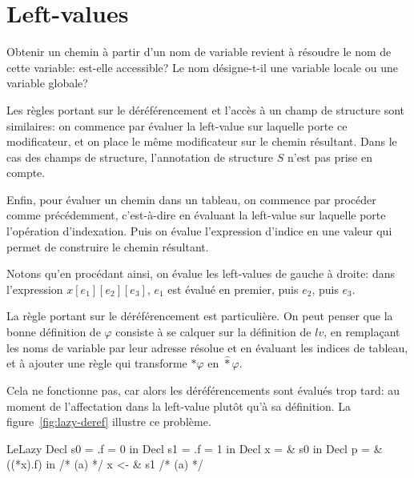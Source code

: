 \section{Left-values}
\label{sec:eval-lv}


Obtenir un chemin à partir d'un nom de variable revient à résoudre le nom de
cette variable: est-elle accessible? Le nom désigne-t-il une variable locale
ou une variable globale?

\begin{mathpar}
\end{mathpar}

Les règles portant sur le déréférencement et l'accès à un champ de structure
sont similaires: on commence par évaluer la left-value sur laquelle porte ce
modificateur, et on place le même modificateur sur le chemin résultant. Dans le
cas des champs de structure, l'annotation de structure $S$ n'est pas prise
en compte.

\begin{mathpar}
\end{mathpar}

Enfin, pour évaluer un chemin dans un tableau, on commence par procéder comme
précédemment, c'est-à-dire en évaluant la left-value sur laquelle porte
l'opération d'indexation. Puis on évalue l'expression d'indice en une valeur qui
permet de construire le chemin résultant.

\begin{mathpar}
\end{mathpar}

Notons qu'en procédant ainsi, on évalue les left-values de gauche à droite:
dans l'expression $x[e_1][e_2][e_3]$, $e_1$ est évalué en premier, puis
$e_2$, puis $e_3$.

La règle portant sur le déréférencement est particulière. On peut penser que la
bonne définition de $φ$ consiste à se calquer sur la définition de $lv$, en
remplaçant les noms de variable par leur adresse résolue et en évaluant les
indices de tableau, et à ajouter une règle qui transforme $*φ$ en
$\widehat{*}φ$.

Cela ne fonctionne pas, car alors les déréférencements sont évalués trop tard:
au moment de l'affectation dans la left-value plutôt qu'à sa définition. La
figure~\ref{fig:lazy-deref} illustre ce problème.

\begin{SaveVerbatim}[]{LeLazy}
Decl s0 = { .f = 0 } in
Decl s1 = { .f = 1 } in
Decl x  = & s0 in
Decl p = & ((*x).f) in
/* (a) */
x <- & s1
/* (a) */
\end{SaveVerbatim}

